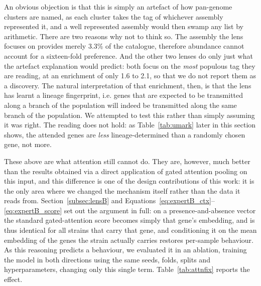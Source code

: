 An obvious objection is that this is simply an artefact of how pan-genome clusters are named, as
each cluster takes the tag of whichever assembly represented it, and a well represented assembly
would then swamp any list by arithmetic. There are two reasons why not to think so. The assembly
the lens focuses on provides merely 3.3\% of the catalogue, therefore abundance cannot account
for a sixteen-fold preference. And the other two lenses do only just what the artefact explanation
would predict: both focus on the \textit{most} populous tag they are reading, at an enrichment of
only 1.6 to 2.1, so that we do not report them as a discovery. The natural interpretation of that
enrichment, then, is that the lens has learnt a lineage fingerprint,
i.e. genes that are expected to be transmitted along a branch of the population will indeed be
transmitted along the same branch of the population. We attempted to test this rather than simply
assuming it was right. The reading does not hold: as Table~\ref{tab:umark} later in this section
shows, the attended genes are \emph{less} lineage-determined than a randomly chosen gene, not
more.

\vspace{1em}

These above are what attention still cannot do. They are, however, much better than the results
obtained via a direct application of gated attention pooling on this input, and this difference is
one of the design contributions of this work: it is the only area where we changed the mechanism
itself rather than the data it reads from. Section~\ref{subsec:lensB} and
Equations~\eqref{eq:expertB_ctx}--\eqref{eq:expertB_score} set out the argument in full: on a
presence-and-absence vector the standard gated-attention score becomes simply that gene's
embedding, and is thus identical for all strains that carry that gene, and conditioning it on the
mean embedding of the genes the strain actually carries restores per-sample behaviour. As this
reasoning predicts a behaviour, we evaluated it in an ablation, training the model in both
directions using the same seeds, folds, splits and hyperparameters, changing only this single
term. Table~\ref{tab:attnfix} reports the effect.

